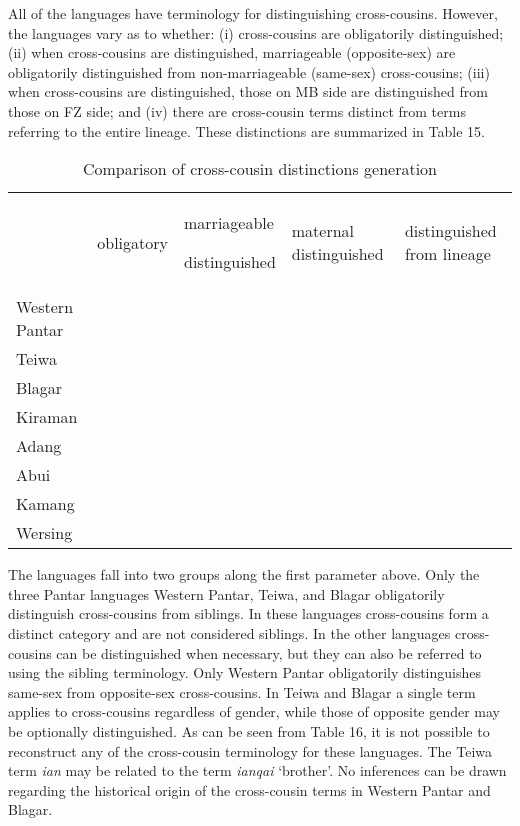  All of the languages have terminology for distinguishing cross-cousins. However, the languages vary as to whether: (i) cross-cousins are obligatorily distinguished; (ii) when cross-cousins are distinguished, marriageable (opposite-sex) are obligatorily distinguished from non-marriageable (same-sex) cross-cousins; (iii) when cross-cousins are distinguished, those on MB side are distinguished from those on FZ side; and (iv) there are cross-cousin terms distinct from terms referring to the entire lineage. These distinctions are summarized in Table 15.



\begin{table}


\begin{tabular}{lllll} & obligatory\par & marriageable\par
 distinguished & maternal
 distinguished & distinguished
  from lineage\\
Western Pantar &  &  &  & \\
Teiwa &  &  &  & \\
Blagar &  &  &  & \\
Kiraman &  &  &  & \\
Adang &  &  &  & \\
Abui &  &  &  & \\
Kamang &  &  &  & \\
Wersing &  &  &  & \\
\end{tabular}

\caption{Comparison of cross-cousin distinctions generation}
\end{table}

The languages fall into two groups along the first parameter above. Only the three Pantar languages Western Pantar, Teiwa, and Blagar obligatorily distinguish cross-cousins from siblings. In these languages cross-cousins form a distinct category and are not considered siblings. In the other languages cross-cousins can be distinguished when necessary, but they can also be referred to using the sibling terminology. Only Western Pantar obligatorily distinguishes same-sex from opposite-sex cross-cousins. In Teiwa and Blagar a single term applies to cross-cousins regardless of gender, while those of opposite gender may be optionally distinguished. As can be seen from Table 16, it is not possible to reconstruct any of the cross-cousin terminology for these languages. The Teiwa term \textit{ian} may be related to the term \textit{ianqai} `brother'. No inferences can be drawn regarding the historical origin of the cross-cousin terms in Western Pantar and Blagar.




